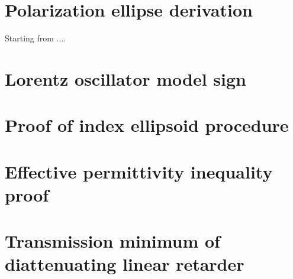 \section{Polarization ellipse derivation}
\label{sec:deriv_pol_ellipse}
Starting from ....
\section{Lorentz oscillator model sign}
\label{sec:lorentz_model_sign}
\section{Proof of index ellipsoid procedure}
\label{sec:index_ellipse_proof}
\section{Effective permittivity inequality proof}
\label{sec:bf_proof}
\section{Transmission minimum of diattenuating linear retarder} %
\label{sec:transmission_min}
